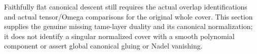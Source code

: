 Faithfully flat canonical descent still requires the actual overlap
identifications and actual tensor/Omega comparisons for the original
whole cover.  This section supplies the genuine missing tame-layer
duality and its canonical normalization; it does not identify a
singular normalized cover with a smooth polynomial component or
assert global canonical gluing or Nadel vanishing.
